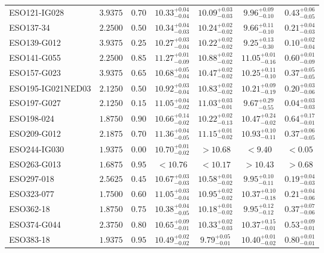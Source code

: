 \documentclass[onecolumn]{mn2e}
\begin{document}
{\begin{center}
\begin{longtable}{lcccccc}
ESO121-IG028 & $3.9375$ & $0.70$ & $10.33_{-0.04}^{+0.04}$ & $10.09_{-0.03}^{+0.03}$ & $9.96_{-0.10}^{+0.09}$ &$0.43_{-0.05}^{+0.06}$ \\
ESO137-34 & $2.2500$ & $0.50$ & $10.34_{-0.03}^{+0.04}$ & $10.24_{-0.02}^{+0.02}$ & $9.66_{-0.10}^{+0.11}$ &$0.21_{-0.03}^{+0.04}$ \\
ESO139-G012 & $3.9375$ & $0.25$ & $10.27_{-0.04}^{+0.03}$ & $10.22_{-0.02}^{+0.02}$ & $9.25_{-0.30}^{+0.13}$ &$0.10_{-0.04}^{+0.02}$ \\
ESO141-G055 & $2.2500$ & $0.85$ & $11.27_{-0.09}^{+0.01}$ & $10.88_{-0.02}^{+0.02}$ & $11.05_{-0.16}^{+0.01}$ &$0.60_{-0.09}^{+0.01}$ \\
ESO157-G023 & $3.9375$ & $0.65$ & $10.68_{-0.04}^{+0.05}$ & $10.47_{-0.02}^{+0.02}$ & $10.25_{-0.10}^{+0.11}$ &$0.37_{-0.05}^{+0.05}$ \\
ESO195-IG021NED03 & $2.1250$ & $0.50$ & $10.92_{-0.04}^{+0.03}$ & $10.83_{-0.02}^{+0.02}$ & $10.21_{-0.19}^{+0.09}$ &$0.20_{-0.06}^{+0.03}$ \\
ESO197-G027 & $2.1250$ & $0.15$ & $11.05_{-0.02}^{+0.04}$ & $11.03_{-0.01}^{+0.03}$ & $9.67_{-0.55}^{+0.29}$ &$0.04_{-0.03}^{+0.03}$ \\
ESO198-024 & $1.8750$ & $0.90$ & $10.66_{-0.02}^{+0.14}$ & $10.22_{-0.13}^{+0.02}$ & $10.47_{-0.02}^{+0.24}$ &$0.64_{-0.01}^{+0.17}$ \\
ESO209-G012 & $2.1875$ & $0.70$ & $11.36_{-0.05}^{+0.04}$ & $11.15_{-0.02}^{+0.01}$ & $10.93_{-0.11}^{+0.10}$ &$0.37_{-0.05}^{+0.06}$ \\
ESO244-IG030 & $1.9375$ & $0.00$ & $10.70_{-0.02}^{+0.01}$ & $>10.68$ & $<9.40$ &$<0.05$ \\
ESO263-G013 & $1.6875$ & $0.95$ & $<10.76$ & $<10.17$ & $>10.43$ &$>0.68$ \\
ESO297-018 & $2.5625$ & $0.45$ & $10.67_{-0.03}^{+0.03}$ & $10.58_{-0.02}^{+0.01}$ & $9.95_{-0.11}^{+0.10}$ &$0.19_{-0.03}^{+0.04}$ \\
ESO323-077 & $1.7500$ & $0.60$ & $11.05_{-0.04}^{+0.03}$ & $10.95_{-0.02}^{+0.02}$ & $10.37_{-0.18}^{+0.10}$ &$0.21_{-0.06}^{+0.04}$ \\
ESO362-18 & $1.8750$ & $0.75$ & $10.38_{-0.05}^{+0.04}$ & $10.18_{-0.02}^{+0.01}$ & $9.95_{-0.12}^{+0.12}$ &$0.37_{-0.06}^{+0.07}$ \\
ESO374-G044 & $2.3750$ & $0.80$ & $10.65_{-0.01}^{+0.09}$ & $10.33_{-0.03}^{+0.02}$ & $10.37_{-0.01}^{+0.15}$ &$0.53_{-0.01}^{+0.09}$ \\
ESO383-18 & $1.9375$ & $0.95$ & $10.49_{-0.02}^{+0.02}$ & $9.79_{-0.01}^{+0.05}$ & $10.40_{-0.02}^{+0.01}$ &$0.80_{-0.01}^{+0.01}$ \\

\end{longtable}
\end{center}}
\end{document}
